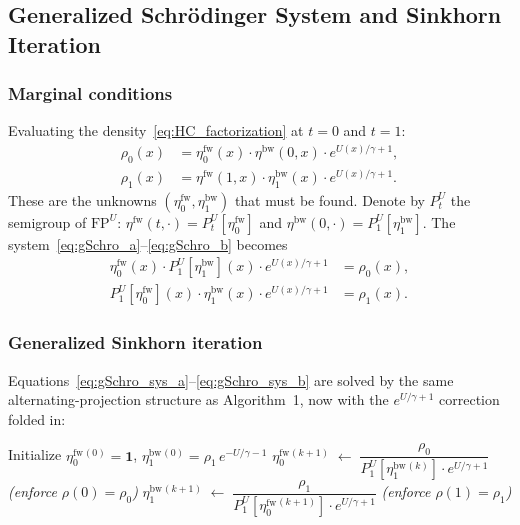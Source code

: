 \documentclass[11pt,a4paper]{article}
\newcommand{\Pt}[1]{P_{#1}}   %
\newcommand{\fw}{{\mathrm{fw}}}   %
\newcommand{\bw}{{\mathrm{bw}}}   %
\newcommand{\FPU}{\mathrm{FP}^U}  %
\begin{document}
\subsection{Generalized Schr\"{o}dinger System and Sinkhorn Iteration}

\subsubsection*{Marginal conditions}

Evaluating the density~\eqref{eq:HC_factorization} at $t=0$ and $t=1$:
\begin{align}
  \rho_0(x)
    &= \eta^\fw_0(x)\cdot\eta^\bw(0,x)\cdot e^{U(x)/\gamma+1},
    \label{eq:gSchro_a}\\
  \rho_1(x)
    &= \eta^\fw(1,x)\cdot\eta^\bw_1(x)\cdot e^{U(x)/\gamma+1}.
    \label{eq:gSchro_b}
\end{align}
These are the unknowns $(\eta^\fw_0, \eta^\bw_1)$ that must be found.
Denote by $\Pt{t}^U$ the semigroup of $\FPU$:
$\eta^\fw(t,\cdot) = \Pt{t}^U[\eta^\fw_0]$ and
$\eta^\bw(0,\cdot) = \Pt{1}^U[\eta^\bw_1]$.
The system~\eqref{eq:gSchro_a}--\eqref{eq:gSchro_b} becomes
\begin{align}
  \eta^\fw_0(x)\cdot\Pt{1}^U[\eta^\bw_1](x)\cdot e^{U(x)/\gamma+1}
    &= \rho_0(x),\label{eq:gSchro_sys_a}\\
  \Pt{1}^U[\eta^\fw_0](x)\cdot\eta^\bw_1(x)\cdot e^{U(x)/\gamma+1}
    &= \rho_1(x).\label{eq:gSchro_sys_b}
\end{align}

\subsubsection*{Generalized Sinkhorn iteration}

Equations~\eqref{eq:gSchro_sys_a}--\eqref{eq:gSchro_sys_b} are solved by
the same alternating-projection structure as Algorithm~1, now with the
$e^{U/\gamma+1}$ correction folded in:

\begin{algorithm}[H]
\caption{Generalized Hopf--Cole Sinkhorn (gSB with potential $U$)}
\begin{algorithmic}[1]
  \State Initialize $\eta^\fw_0{}^{(0)} = \mathbf{1}$,\;
         $\eta^\bw_1{}^{(0)} = \rho_1\,e^{-U/\gamma-1}$
    \State $\eta^\fw_0{}^{(k+1)}
           \;\leftarrow\;
           \dfrac{\rho_0}{\Pt{1}^U[\eta^\bw_1{}^{(k)}]\cdot e^{U/\gamma+1}}$
           \hfill\textit{(enforce $\rho(0)=\rho_0$)}
    \State $\eta^\bw_1{}^{(k+1)}
           \;\leftarrow\;
           \dfrac{\rho_1}{\Pt{1}^U[\eta^\fw_0{}^{(k+1)}]\cdot e^{U/\gamma+1}}$
           \hfill\textit{(enforce $\rho(1)=\rho_1$)}
  \EndFor
\end{algorithmic}
\end{algorithm}
\end{document}

